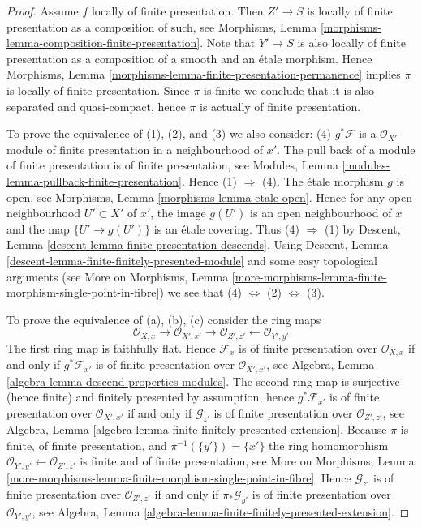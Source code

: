\begin{proof}
Assume $f$ locally of finite presentation. Then $Z' \to S$ is locally
of finite presentation as a composition of such, see
Morphisms, Lemma \ref{morphisms-lemma-composition-finite-presentation}.
Note that $Y' \to S$ is also locally of finite presentation as a composition
of a smooth and an \'etale morphism. Hence
Morphisms, Lemma \ref{morphisms-lemma-finite-presentation-permanence}
implies $\pi$ is locally of finite presentation.
Since $\pi$ is finite we conclude that it is also separated and
quasi-compact, hence $\pi$ is actually of finite presentation.

\medskip\noindent
To prove the equivalence of (1), (2), and (3) we also consider:
(4) $g^*\mathcal{F}$ is a $\mathcal{O}_{X'}$-module of finite presentation
in a neighbourhood of $x'$. The pull back of a module of finite presentation
is of finite presentation, see
Modules, Lemma \ref{modules-lemma-pullback-finite-presentation}.
Hence (1) $\Rightarrow$ (4).
The \'etale morphism $g$ is open, see
Morphisms, Lemma \ref{morphisms-lemma-etale-open}.
Hence for any open neighbourhood $U' \subset X'$ of $x'$, the image
$g(U')$ is an open neighbourhood of $x$ and the map
$\{U' \to g(U')\}$ is an \'etale covering. Thus (4) $\Rightarrow$ (1) by
Descent, Lemma \ref{descent-lemma-finite-presentation-descends}.
Using
Descent, Lemma \ref{descent-lemma-finite-finitely-presented-module}
and some easy topological arguments (see
More on Morphisms,
Lemma \ref{more-morphisms-lemma-finite-morphism-single-point-in-fibre})
we see that
(4) $\Leftrightarrow$ (2) $\Leftrightarrow$ (3).

\medskip\noindent
To prove the equivalence of (a), (b), (c) consider the ring maps
$$
\mathcal{O}_{X, x} \to
\mathcal{O}_{X', x'} \to
\mathcal{O}_{Z', z'} \leftarrow
\mathcal{O}_{Y', y'}
$$
The first ring map is faithfully flat. Hence
$\mathcal{F}_x$ is of finite presentation over $\mathcal{O}_{X, x}$
if and only if $g^*\mathcal{F}_{x'}$ is of finite presentation over
$\mathcal{O}_{X', x'}$, see
Algebra, Lemma \ref{algebra-lemma-descend-properties-modules}.
The second ring map is surjective (hence finite) and
finitely presented by assumption, hence
$g^*\mathcal{F}_{x'}$ is of finite presentation over $\mathcal{O}_{X', x'}$
if and only if $\mathcal{G}_{z'}$ is of finite presentation over
$\mathcal{O}_{Z', z'}$, see
Algebra, Lemma \ref{algebra-lemma-finite-finitely-presented-extension}.
Because $\pi$ is finite, of finite presentation, and
$\pi^{-1}(\{y'\}) = \{x'\}$ the ring homomorphism
$\mathcal{O}_{Y', y'} \leftarrow \mathcal{O}_{Z', z'}$ is finite
and of finite presentation, see
More on Morphisms,
Lemma \ref{more-morphisms-lemma-finite-morphism-single-point-in-fibre}.
Hence $\mathcal{G}_{z'}$ is of finite presentation over $\mathcal{O}_{Z', z'}$
if and only if $\pi_*\mathcal{G}_{y'}$ is of finite presentation over
$\mathcal{O}_{Y', y'}$, see
Algebra, Lemma \ref{algebra-lemma-finite-finitely-presented-extension}.
\end{proof}

